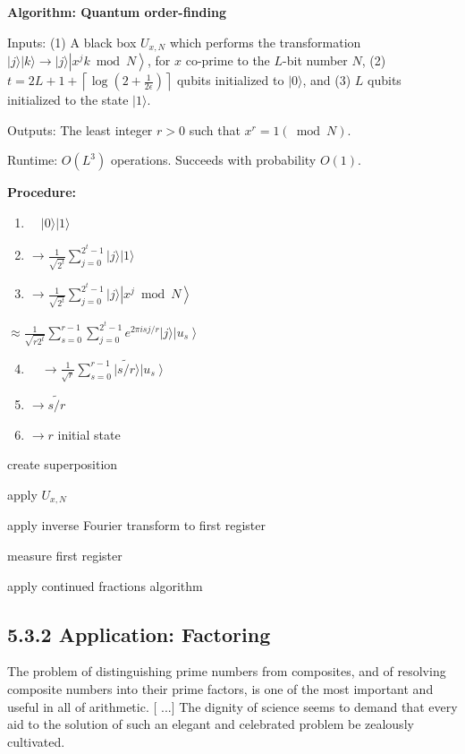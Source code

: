\textbf{Algorithm: Quantum order-finding}

Inputs: (1) A black box $U_{x, N}$ which performs the transformation $|j\rangle|k\rangle \rightarrow|j\rangle\left|x^{j} k \bmod N\right\rangle$, for $x$ co-prime to the $L$-bit number $N$, (2) $t=2 L+1+\left\lceil\log \left(2+\frac{1}{2 \epsilon}\right)\right\rceil$ qubits initialized to $|0\rangle$, and (3) $L$ qubits initialized to the state $|1\rangle$.

Outputs: The least integer $r>0$ such that $x^{r}=1(\bmod N)$.

Runtime: $O\left(L^{3}\right)$ operations. Succeeds with probability $O(1)$.

\textbf{Procedure:}
\begin{enumerate}
    \item $\quad|0\rangle|1\rangle$
    \item $\rightarrow \frac{1}{\sqrt{2^{t}}} \sum_{j=0}^{2^{t}-1}|j\rangle|1\rangle$
    \item $\rightarrow \frac{1}{\sqrt{2^{t}}} \sum_{j=0}^{2^{t}-1}|j\rangle\left|x^{j} \bmod N\right\rangle$

\end{enumerate}

$\approx \frac{1}{\sqrt{r 2^{t}}} \sum_{s=0}^{r-1} \sum_{j=0}^{2^{t}-1} e^{2 \pi i s j / r}|j\rangle\left|u_{s}\right\rangle$

\begin{enumerate}
  \setcounter{enumi}{3}
    \item $\quad \rightarrow \frac{1}{\sqrt{r}} \sum_{s=0}^{r-1}|\widetilde{s / r}\rangle\left|u_{s}\right\rangle$
    \item $\rightarrow \widetilde{s / r}$
    \item $\rightarrow r$ initial state

\end{enumerate}

create superposition

apply $U_{x, N}$

apply inverse Fourier transform to first register

measure first register

apply continued fractions algorithm

\subsection{5.3.2 Application: Factoring}
The problem of distinguishing prime numbers from composites, and of resolving composite numbers into their prime factors, is one of the most important and useful in all of arithmetic. [ ...] The dignity of science seems to demand that every aid to the solution of such an elegant and celebrated problem be zealously cultivated.


